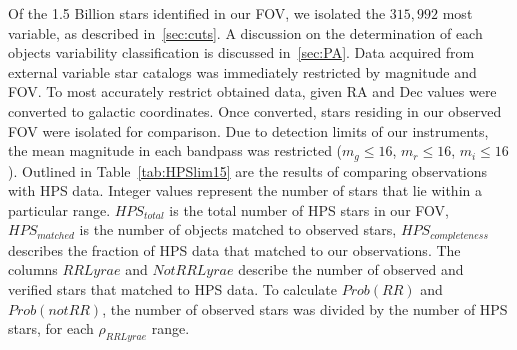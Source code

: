 \documentclass[aps,prb,twocolumn,superscriptaddress]{revtex4-1}
\begin{document}
Of the 1.5 Billion stars identified in our FOV, we isolated the $315,992$ most variable, 
as described in~\cref{sec:cuts}.  
A discussion on the determination of each objects variability classification is discussed in~\cref{sec:PA}.  Data acquired from external 
variable star catalogs was immediately restricted by magnitude and FOV.  
To most accurately restrict obtained data, given RA and Dec values were converted to galactic coordinates.  Once converted, 
stars residing in our observed FOV were isolated for comparison.  Due to detection limits of our instruments, the mean 
magnitude in each bandpass was restricted ($m_{g}\leq16$, $m_{r}\leq16$, $m_{i}\leq16$).
Outlined in Table~\ref{tab:HPSlim15} are the results of comparing observations with HPS data.  Integer values represent the number of stars that lie within a particular range.  
$HPS_{total}$ is the total number of HPS stars in our FOV, $HPS_{matched}$ is the number of objects matched to observed stars, $HPS_{completeness}$ describes the fraction of HPS data that matched to our observations.  The columns $RR Lyrae$ and $Not RR Lyrae$ describe the 
number of observed and verified stars that matched to HPS data.  To calculate $Prob(RR)$ and $Prob(notRR)$, the number of observed stars was 
divided by the number of HPS stars, for each $\rho_{RRLyrae}$ range.

\end{document}
